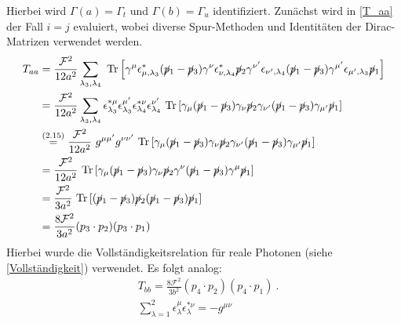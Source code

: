 Hierbei wird $\Gamma(a) = \Gamma_t$ und $ \Gamma(b) = \Gamma_u$ identifiziert. Zunächst wird in \textsf{\autoref{T_aa}} der Fall $i = j$ evaluiert, wobei diverse Spur-Methoden und Identitäten der Dirac-Matrizen verwendet werden.
\begin{equation}
\begin{aligned}
T_{aa} &= \frac{\mathcal{F}^2}{12a^2} \sum_{\lambda_3, \lambda_4}~\text{Tr}\left[ \gamma^\mu \epsilon^*_{\mu,\lambda_3} (\cancel{p}_1- \cancel{p}_3)  \gamma^\nu \epsilon_{\nu, \lambda_4}^* \cancel{p}_2 \gamma^{\nu'} \epsilon_{\nu', \lambda_4} (\cancel{p}_1- \cancel{p}_3)  \gamma^{\mu'} \epsilon_{\mu', \lambda_3} \cancel{p}_1 \right] \\
&= \frac{\mathcal{F}^2}{12a^2} \sum_{\lambda_3, \lambda_4}\epsilon^{*\mu}_{\lambda_3}\epsilon^{\mu'} _{\lambda_3} \epsilon^{*\nu}_{\lambda_4}\epsilon^{\nu'}_{\lambda_4}~\text{Tr}\left[ \gamma_\mu (\cancel{p}_1- \cancel{p}_3)  \gamma_\nu \cancel{p}_2 \gamma_{\nu'} (\cancel{p}_1- \cancel{p}_3)  \gamma_{\mu'} \cancel{p}_1\right]\\
&\overset{\text{(2.15)}}{=}\frac{\mathcal{F}^2}{12a^2}~g^{\mu\mu'}g^{\nu\nu'}~\text{Tr}\left[ \gamma_\mu (\cancel{p}_1- \cancel{p}_3)  \gamma_\nu \cancel{p}_2 \gamma_{\nu'} (\cancel{p}_1- \cancel{p}_3)  \gamma_{\mu'} \cancel{p}_1\right] \\
&=\frac{\mathcal{F}^2}{12a^2}~\text{Tr}\left[ \gamma_\mu (\cancel{p}_1- \cancel{p}_3)  \gamma_\nu \cancel{p}_2 \gamma^{\nu} (\cancel{p}_1- \cancel{p}_3)  \gamma^{\mu} \cancel{p}_1\right]\\
&=\frac{\mathcal{F}^2}{3a^2}~\text{Tr}\left[(\cancel{p}_1- \cancel{p}_3) \cancel{p}_2 (\cancel{p}_1- \cancel{p}_3)\cancel{p}_1\right] \\
&=\frac{8\mathcal{F}^2}{3a^2}(p_3\cdot p_2)(p_3\cdot p_1)
\end{aligned}
\label{T_aa}
\end{equation}
Hierbei wurde die Vollständigkeitsrelation für reale Photonen (siehe \textsf{\autoref{Vollständigkeit}}) verwendet. Es folgt analog:
\begin{align}
&T_{bb} = \frac{8\mathcal{F}^2}{3b^2}(p_4\cdot p_2)(p_4\cdot p_1)~. \\
&\sum_{\lambda = 1}^{2} \epsilon^\mu_{\lambda} \epsilon^{*\nu}_{\lambda} = -g^{\mu \nu}
\label{Vollständigkeit}
\end{align}
